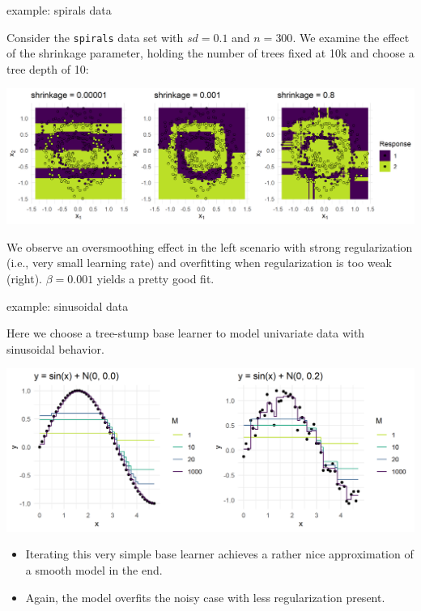 \begin{vbframe}{example: spirals data}

Consider the \texttt{spirals} data set with $\mathit{sd} = 0.1$ and $n = 300$.
We examine the effect of the shrinkage parameter, holding the number of trees 
fixed at 10k and choose a tree depth of 10:

\vfill

\includegraphics[width = \textwidth]{figure/gbm_regu_oversmoothing_overfitting}

\vfill

We observe an oversmoothing effect in the left scenario with strong 
regularization (i.e., very small learning rate) and overfitting when 
regularization is too weak (right). $\beta = 0.001$  yields a pretty good fit.

\end{vbframe}


\begin{vbframe}{example: sinusoidal data}

Here we choose a tree-stump base learner to model univariate data 
with sinusoidal behavior.


\begin{center}
  \includegraphics[width=\textwidth]{figure/gbm_sine.png}
\end{center}


\small
\begin{itemize}
  \item Iterating this very simple base learner achieves a rather nice
  approximation of a smooth model in the end.
  \item Again, the model overfits the noisy case with less 
  regularization present.
\end{itemize}

\end{vbframe}

\endlecture

